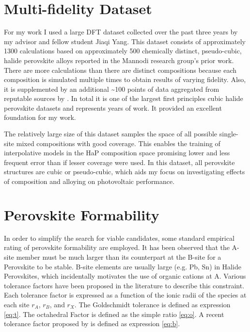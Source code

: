\section{Multi-fidelity Dataset}
\label{sec:org3cf3baf}
For my work I used a large DFT dataset collected over the past three years by my advisor and fellow student Jiaqi Yang.
This dataset consists of approximately 1300 calculations based on approximately 500 chemically distinct, pseudo-cubic, halide perovskite alloys reported in the Mannodi research group's prior work.
\autocite{mannodi-kanakkithodi-2022-data-driven,yang-2023-high-throug}
There are more calculations than there are distinct compositions because each composition is simulated multiple times to obtain results of varying fidelity.
Also, it is supplemented by an additional \textasciitilde{}100 points of data aggregated from reputable sources by \textcite{almora-2020-devic-perfor}.
In total it is one of the largest first principles cubic halide perovskite datasets and represents years of work.
It provided an excellent foundation for my work.

The relatively large size of this dataset samples the space of all possible single-site mixed compositions with good coverage.
This enables the training of interpolative models in the HaP composition space promising lower and less frequent error than if lesser coverage were used.
In this dataset, all perovskite structures are cubic or pseudo-cubic, which aids my focus on investigating effects of composition and alloying on photovoltaic performance.

\section{Perovskite Formability}
\label{sec:orgd227544}
In order to simplify the search for viable candidates, some standard empirical rating of perovskite formability are employed.
It has been observed that the A-site member must be much larger than its counterpart at the B-site for a Perovskite to be stable.
B-site elements are usually large (e.g. Pb, Sn) in Halide Perovskites, which incidentally motivates the use of organic cations at A.
\autocite{kieslich-2015-exten-toler}
Various tolerance factors have been proposed in the literature to describe this constraint.
Each tolerance factor is expressed as a function of the ionic radii of the species at each site \(r_A\), \(r_B\), and \(r_X\).
The Goldschmidt tolerance is defined as expression \ref{eq:t}.
\autocite{yin-2015-halid-perov}
The octahedral Factor is defined as the simple ratio \ref{eq:o}.
A recent tolerance factor proposed by \textcite{bartel-2019-new-toler} is defined as expression \ref{eq:b}.

